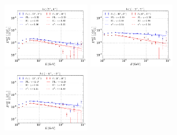 \begin{figure}[h!]
\includegraphics[width=0.33\textwidth]{plots/SED_boxes_source_4.pdf}
\includegraphics[width=0.33\textwidth]{plots/SED_boxes_source_0.pdf}
\includegraphics[width=0.33\textwidth]{plots/SED_boxes_source_-4.pdf}

\end{figure}
